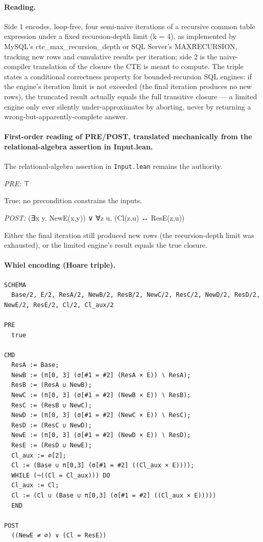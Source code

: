 \documentclass[10pt]{article}
\begin{document}
\paragraph{Reading.} Side 1 encodes, loop-free, four semi-naive iterations of a recursive common table expression under a fixed recursion-depth limit (k = 4), as implemented by MySQL's cte\_max\_recursion\_depth or SQL Server's MAXRECURSION, tracking new rows and cumulative results per iteration; side 2 is the naive-compiler translation of the closure the CTE is meant to compute. The triple states a conditional correctness property for bounded-recursion SQL engines: if the engine's iteration limit is not exceeded (the final iteration produces no new rows), the truncated result actually equals the full transitive closure --- a limited engine only ever silently under-approximates by aborting, never by returning a wrong-but-apparently-complete answer.

\paragraph{First-order reading of PRE/POST, translated mechanically from the relational-algebra assertion in Input.lean.} The relational-algebra assertion in \texttt{Input.lean} remains the authority.

\textit{PRE:} ⊤\par True; no precondition constrains the inputs.

\textit{POST:} (∃x y. NewE(x,y)) ∨ ∀z u. (Cl(z,u) ↔ ResE(z,u))\par Either the final iteration still produced new rows (the recursion-depth limit was exhausted), or the limited engine's result equals the true closure.

\paragraph{Whiel encoding (Hoare triple).}

\begin{Verbatim}[fontsize=\scriptsize,breaklines=true,breakanywhere=true,frame=single,framesep=1.5mm]
SCHEMA
  Base/2, E/2, ResA/2, NewB/2, ResB/2, NewC/2, ResC/2, NewD/2, ResD/2, NewE/2, ResE/2, Cl/2, Cl_aux/2

PRE
  true 

CMD
  ResA := Base;
  NewB := (π[0, 3] (σ[#1 = #2] (ResA × E)) ∖ ResA);
  ResB := (ResA ∪ NewB);
  NewC := (π[0, 3] (σ[#1 = #2] (NewB × E)) ∖ ResB);
  ResC := (ResB ∪ NewC);
  NewD := (π[0, 3] (σ[#1 = #2] (NewC × E)) ∖ ResC);
  ResD := (ResC ∪ NewD);
  NewE := (π[0, 3] (σ[#1 = #2] (NewD × E)) ∖ ResD);
  ResE := (ResD ∪ NewE);
  Cl_aux := ∅[2];
  Cl := (Base ∪ π[0,3] (σ[#1 = #2] ((Cl_aux × E))));
  WHILE (¬((Cl = Cl_aux))) DO
  Cl_aux := Cl;
  Cl := (Cl ∪ (Base ∪ π[0,3] (σ[#1 = #2] ((Cl_aux × E)))))
  END

POST
  ((NewE ≠ ∅) ∨ (Cl = ResE))
\end{Verbatim}
\end{document}
